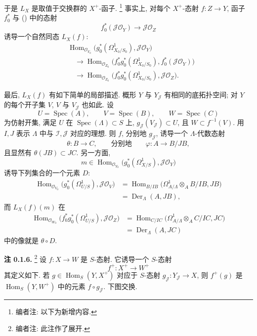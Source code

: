 于是 \(L_X\) 是取值于交换群的 \(X^+\)-函子.
\footnote{编者注: 以下为新增内容.} 事实上, 对每个
\(X^+\)-态射 \(f:Z\to Y\), 函子 \(f_0^*\) 与
() 中的态射
\[
 f_0^*(\mathscr J\mathscr O_Y)\longrightarrow
 \mathscr J\mathscr O_Z
\]
诱导一个自然同态 \(L_X(f)\):
\[
\begin{aligned}
 &\operatorname{Hom}_{\mathscr O_{Y_0}}
   \bigl(g_0^*(\Omega^1_{X_0/S_0}),\mathscr J\mathscr O_Y\bigr)\\
 &\quad\longrightarrow
 \operatorname{Hom}_{\mathscr O_{Z_0}}
   \bigl(f_0^*g_0^*(\Omega^1_{X_0/S_0}),
         f_0^*(\mathscr J\mathscr O_Y)\bigr)\\
 &\quad\longrightarrow
 \operatorname{Hom}_{\mathscr O_{Z_0}}
   \bigl(f_0^*g_0^*(\Omega^1_{X_0/S_0}),
         \mathscr J\mathscr O_Z\bigr).
\end{aligned}
\]

最后, \(L_X(f)\) 有如下简单的局部描述. 概形 \(Y\) 与
\(Y_{\mathscr J}\) 有相同的底拓扑空间; 对 \(Y\) 的每个开子集
\(V\), \(V\) 与 \(V_{\mathscr J}\) 也如此. 设
\[
 U=\operatorname{Spec}(A),\qquad
 V=\operatorname{Spec}(B),\qquad
 W=\operatorname{Spec}(C)
\]
为仿射开集, 满足 \(U\) 在 \(\operatorname{Spec}(\Lambda)\subset S\) 上,
\(g_{\mathscr J}(V_{\mathscr J})\subset U\), 且
\(W\subset f^{-1}(V)\). 用 \(I,J\) 表示 \(\Lambda\) 中与
\(\mathscr I,\mathscr J\) 对应的理想. 则 \(f\), 分别地
\(g_{\mathscr J}\), 诱导一个 \(\Lambda\)-代数态射
\[
 \theta:B\longrightarrow C,
 \qquad\text{分别地}\qquad
 \varphi:A\longrightarrow B/JB,
\]
且显然有 \(\theta(JB)\subset JC\). 另一方面,
\[
 m\in
 \operatorname{Hom}_{\mathscr O_{Y_0}}
 \bigl(g_0^*(\Omega^1_{X/S}),\mathscr J\mathscr O_Y\bigr)
\]
诱导下列集合的一个元素 \(D\):
\[
\begin{aligned}
 \operatorname{Hom}_{\mathscr O_{V_0}}
 \bigl(g_0^*(\Omega^1_{U/S}),\mathscr J\mathscr O_V\bigr)
 &=
 \operatorname{Hom}_{B/IB}
 \bigl(\Omega^1_{A/\Lambda}\otimes_A B/IB,JB\bigr)\\
 &=\operatorname{Der}_{\Lambda}(A,JB),
\end{aligned}
\]
而 \(L_X(f)(m)\) 在
\[
\begin{aligned}
 \operatorname{Hom}_{\mathscr O_{W_0}}
 \bigl(f_0^*g_0^*(\Omega^1_{U/S}),\mathscr J\mathscr O_Z\bigr)
 &=
 \operatorname{Hom}_{C/IC}
 \bigl(\Omega^1_{A/\Lambda}\otimes_A C/IC,JC\bigr)\\
 &=\operatorname{Der}_{\Lambda}(A,JC)
\end{aligned}
\]
中的像就是 \(\theta\circ D\).

\medskip
\noindent{}\textbf{注 0.1.6.}
\footnote{编者注: 此注作了展开.}
设 \(f:X\to W\) 是 \(S\)-态射. 它诱导一个 \(S\)-态射
\[
 f^+:X^+\longrightarrow W^+
\]
其定义如下. 若 \(g\in\operatorname{Hom}_S(Y,X^+)\) 对应于
\(S\)-态射 \(g_{\mathscr J}:Y_{\mathscr J}\to X\), 则
\(f^+(g)\) 是 \(\operatorname{Hom}_S(Y,W^+)\) 中的元素
\(f\circ g_{\mathscr J}\). 下图交换.

